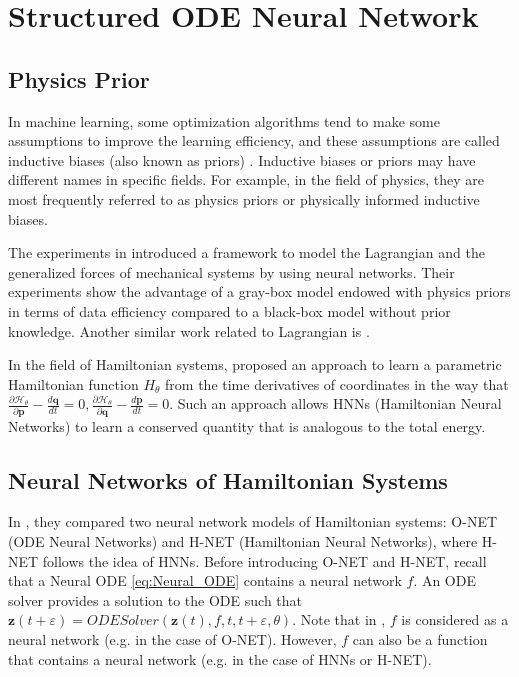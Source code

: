 \documentclass[
	parskip, 			   %
	twoside, 			   %
	DIV=14, 			   %
	BCOR=15.0mm, 		   %
	headsepline, 		   %
	open=right, 		   %
	captions=tableheading, %
	bibliography=totoc,    %
	numbers=noenddot       %
]{scrreprt}
\begin{document}
\clearpage
\chapter{Structured ODE Neural Network}
\label{ch:chapter6}
\section{Physics Prior}
In machine learning, some optimization algorithms tend to make some assumptions to improve the learning efficiency, and these assumptions are called inductive biases (also known as priors) \cite{mitchell1997machine}. Inductive biases or priors may have different names in specific fields. For example, in the field of physics, they are most frequently referred to as physics priors or physically informed inductive biases.

The experiments in \cite{gupta2019general} introduced a framework to model the Lagrangian and the generalized forces of mechanical systems by using neural networks. Their experiments show the advantage of a gray-box model endowed with physics priors in terms of data efficiency compared to a black-box model without prior knowledge. Another similar work related to Lagrangian is \cite{lutter2019deep}.

In the field of Hamiltonian systems, \cite{greydanus2019hamiltonian} proposed an approach to learn a parametric Hamiltonian function $H_{\theta}$ from the time derivatives of coordinates in the way that $\frac{\partial \mathcal{H}_{\theta}}{\partial \mathbf{p}} - \frac{d\mathbf{q}}{dt} = 0, \frac{\partial \mathcal{H}_{\theta}}{\partial \mathbf{q}} - \frac{d\mathbf{p}}{dt} = 0 $. Such an approach allows HNNs (Hamiltonian Neural Networks) to learn a conserved quantity that is analogous to the total energy.

\section{Neural Networks of Hamiltonian Systems}
In \cite{chen2019symplectic}, they compared two neural network models of Hamiltonian systems: O-NET (ODE Neural Networks) and H-NET (Hamiltonian Neural Networks), where H-NET follows the idea of HNNs. 
Before introducing O-NET and H-NET, recall that a Neural ODE \ref{eq:Neural_ODE} contains a neural network $f$. An ODE solver provides a solution to the ODE such that $\mathbf{z}(t+\varepsilon) = ODESolver(\mathbf{z}(t), f, t, t+\varepsilon , \theta)$. Note that in \cite{chen2019symplectic}, $f$ is considered as a neural network (e.g. in the case of O-NET). However, $f$ can also be a function that contains a neural network (e.g. in the case of HNNs or H-NET). 
\end{document}
